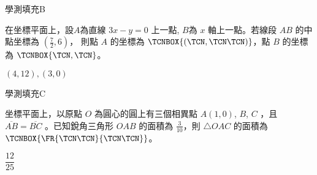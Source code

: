     \begin{QUESTION}
        \begin{ExamInfo}{97}{學測}{填充}{B}
        \end{ExamInfo}
        \begin{ExamAnsRateInfo}{63}{96}{75}{18}
        \end{ExamAnsRateInfo}
        \begin{QBODY}
            在坐標平面上，設$A$為直線 $3x-y=0$ 上一點, $B$為 $x$ 軸上一點。若線段 $AB$ 的中點坐標為 $(\frac{7}{2},6)$， 則點 $A$ 的坐標為 $\TCNBOX{(\TCN,\TCN\TCN)}$，點 $B$ 的坐標為 $\TCNBOX{\TCN,\TCN}$。
        \end{QBODY}
        \begin{QFROMS}
        \end{QFROMS}
        \begin{QTAGS}\end{QTAGS}
        \begin{QANS}
            $(4,12), (3,0)$
        \end{QANS}
        \begin{QSOLLIST}
        \end{QSOLLIST}
        \begin{QEMPTYSPACE}
        \end{QEMPTYSPACE}
    \end{QUESTION}
    \begin{QUESTION}
        \begin{ExamInfo}{97}{學測}{填充}{C}
        \end{ExamInfo}
        \begin{ExamAnsRateInfo}{19}{51}{6}{0}
        \end{ExamAnsRateInfo}
        \begin{QBODY}
            坐標平面上，以原點 $O$ 為圓心的圓上有三個相異點 $A(1, 0)$, $B$, $C$ ，且 $\overline{AB} = \overline{BC}$ 。已知銳角三角形 $OAB$ 的面積為 $\frac{3}{10}$，則 $\triangle OAC$ 的面積為 $\TCNBOX{\FR{\TCN\TCN}{\TCN\TCN}}$。
        \end{QBODY}
        \begin{QFROMS}
        \end{QFROMS}
        \begin{QTAGS}\end{QTAGS}
        \begin{QANS}
            $\dfrac{12}{25}$
        \end{QANS}
        \begin{QSOLLIST}
        \end{QSOLLIST}
        \begin{QEMPTYSPACE}
        \end{QEMPTYSPACE}
    \end{QUESTION}
